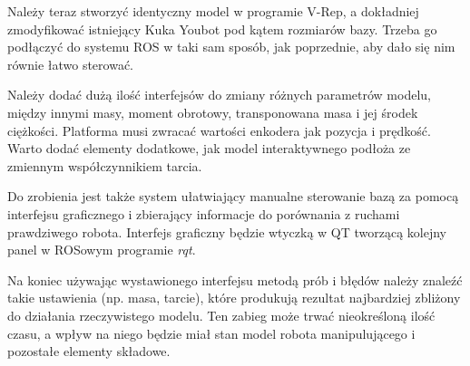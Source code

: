 Należy teraz stworzyć identyczny model w programie V-Rep, a dokładniej zmodyfikować istniejący Kuka Youbot pod kątem rozmiarów bazy.
Trzeba go podłączyć do systemu ROS w taki sam sposób, jak poprzednie, aby dało się nim równie łatwo sterować.

Należy dodać dużą ilość interfejsów do zmiany różnych parametrów modelu, między innymi masy, moment obrotowy, transponowana masa i jej środek ciężkości.
Platforma musi zwracać wartości enkodera jak pozycja i prędkość.
Warto dodać elementy dodatkowe, jak model interaktywnego podłoża ze zmiennym współczynnikiem tarcia.

Do zrobienia jest także system ułatwiający manualne sterowanie bazą za pomocą interfejsu graficznego i zbierający informacje do porównania z ruchami prawdziwego robota.
Interfejs graficzny będzie wtyczką w QT tworzącą kolejny panel w ROSowym programie \emph{rqt}.

Na koniec używając wystawionego interfejsu metodą prób i błędów należy znaleźć takie ustawienia (np. masa, tarcie), które produkują rezultat najbardziej zbliżony do działania rzeczywistego modelu.
Ten zabieg może trwać nieokreśloną ilość czasu, a wpływ na niego będzie miał stan model robota manipulującego i pozostałe elementy składowe.
